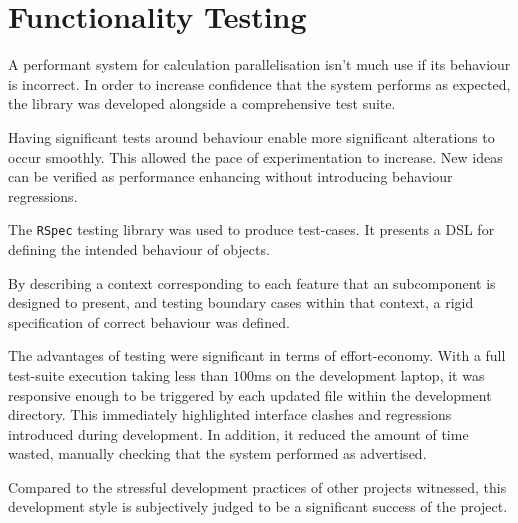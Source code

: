 \section{Functionality Testing}
A performant system for calculation parallelisation isn't much use if its behaviour is incorrect. In order to increase confidence that the system performs as expected, the library was developed alongside a comprehensive test suite.

Having significant tests around behaviour enable more significant alterations to occur smoothly. This allowed the pace of experimentation to increase. New ideas can be verified as performance enhancing without introducing behaviour regressions.

The \verb|RSpec|\cite{rspec} testing library was used to produce test-cases. It presents a \ac{DSL} for defining the intended behaviour of objects.

By describing a context corresponding to each feature that an subcomponent is designed to present, and testing boundary cases within that context, a rigid specification of correct behaviour was defined.

The advantages of testing were significant in terms of effort-economy. With a full test-suite execution taking less than $100$ms on the development laptop, it was responsive enough to be triggered by each updated file within the development directory. This immediately highlighted interface clashes and regressions introduced during development. In addition, it reduced the amount of time wasted, manually checking that the system performed as advertised.

Compared to the stressful development practices of other projects witnessed, this development style is subjectively judged to be a significant success of the project.


